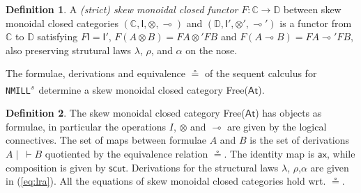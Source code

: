 \documentclass[submission,copyright,creativecommons]{eptcs}
\theoremstyle{definition}
\newtheorem{defn}{Definition}[section]
\newcommand{\ax}{\mathsf{ax}}
\newcommand{\ot}{\otimes}
\newcommand{\lolli}{\multimap}
\newcommand{\I}{\mathsf{I}}
\newcommand{\NMILL}{\texttt{NMILL}}
\newcommand{\SkNMILL}{\NMILL\textsuperscript{\textit{s}}}
\newcommand{\FSkMCC}{\textsf{Free}}
\begin{document}
\begin{defn}
  A \emph{(strict) skew monoidal closed functor} $F : \mathbb{C} \rightarrow \mathbb{D}$ between skew monoidal closed categories $(\mathbb{C} , \I , \ot , \lolli)$ and $(\mathbb{D} , \I' , \ot' , \lolli')$ is a functor from $\mathbb{C}$ to $\mathbb{D}$ satisfying
    $F \I = \I'$, $F (A \ot B) = F A \ot' F B$ and
    $F(A \lolli B) = F A \lolli' F B$, also preserving  strutural laws $\lambda$, $\rho$, and $\alpha$ on the nose.
\end{defn}

The formulae, derivations and equivalence $\circeq$ of the sequent calculus for \SkNMILL\ determine a skew monoidal closed category \FSkMCC($\mathsf{At}$).
\begin{defn}\label{def:fskmcc}
  The skew monoidal closed category \FSkMCC($\mathsf{At}$) has
  objects as formulae, in particular the operations $I$, $\ot$ and $\lolli$ are given by the logical connectives. The set of maps between formulae $A$ and $B$ is the set of derivations $A \mid ~ \vdash B$ quotiented by the equivalence relation $\circeq$. The identity map is $\ax$, while composition is given by $\mathsf{scut}$. Derivations for the structural laws $\lambda$, $\rho$,$\alpha$ are given in (\ref{eq:lra}). All the equations of skew monoidal closed categories hold wrt. $\circeq$.
\end{defn}
\end{document}

